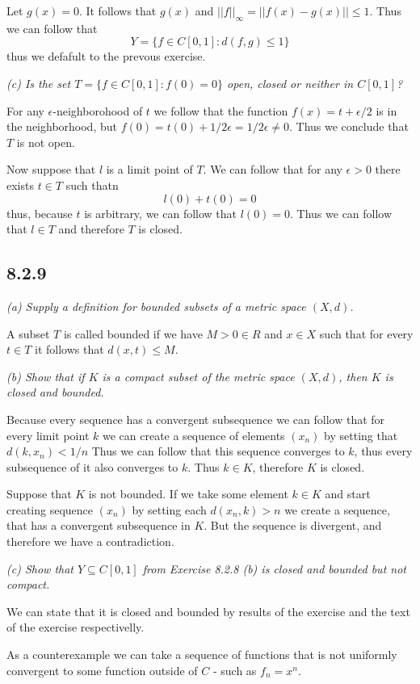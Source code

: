 \documentclass[11pt,oneside,titlepage]{book}
\begin{document}
Let $g(x) = 0$. It follows that $g(x)$ and $||f||_\infty = ||f(x) - g(x)|| \leq 1$. Thus we can
follow that
$$Y = \{f \in C[0, 1]: d(f, g) \leq 1\}$$
thus we defafult to the prevous exercise.

\textit{(c) Is the set $T = \{f \in C[0, 1]: f(0) = 0\}$ open, closed or neither in $C[0, 1]$?}

For any $\epsilon$-neighborohood of $t$
we follow that the function $f(x) = t + \epsilon/2$ is in the neighborhood, but
$f(0) = t(0) + 1/2\epsilon = 1/2\epsilon  \neq 0$. Thus we conclude that $T$ is not open.

Now suppose that $l$ is a limit point of $T$. We can follow that for any $\epsilon > 0$ there
exists $t \in T$ such thatn
$$l(0) + t(0) = 0$$
thus, because $t$ is arbitrary, we can follow that $l(0) = 0$. Thus we can follow that
$l \in T$ and therefore $T$ is closed.

\subsection*{8.2.9}
\textit{(a) Supply a definition for bounded subsets of a metric space $(X, d)$.}

A subset $T$ is called bounded if we have $M > 0 \in R$ and $x \in X$ such that for
every $t \in T$ it  follows  that $d(x, t) \leq M$.

\textit{(b) Show that if $K$ is a compact subset of the metric space $(X, d)$, then $K$
  is closed and bounded.}

Because every sequence has a convergent subsequence we can follow that for every limit
point $k$ we can create a sequence of elements $(x_n)$ by setting that $d(k, x_n) < 1/n$
Thus we can follow that this sequence converges to $k$, thus every subsequence of
it also converges to $k$. Thus $k \in K$, therefore $K$ is closed.

Suppose that $K$ is not bounded.
If we take some element $k \in K$ and start creating sequence $(x_n)$ by setting each
$d(x_n, k) > n$ we create a sequence, that has a convergent subsequence in $K$. But the
sequence is divergent, and therefore we have a contradiction.

\textit{(c) Show that $Y \subseteq C[0, 1]$ from Exercise 8.2.8 (b) is closed and bounded but
  not compact.}

We can state that it is closed and bounded by results of the exercise and the text of the
exercise respectivelly.

As a counterexample we can take a sequence of functions that is not uniformly convergent
to some function outside of $C$ - such as $f_n = x^n$.
\end{document}
